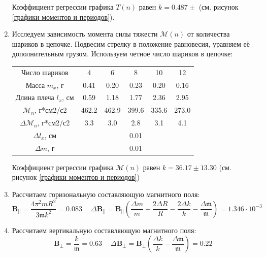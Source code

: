 \documentclass[a4paper, 10pt]{article}
\begin{document}
\begin{enumerate}
\begin{center}
\begin{tabular}{|c|c|c|c|c|c|c|c|c|c|c|}
            \hline
        \end{tabular}
    \end{center}
    Коэффициент регрессии графика $T(n)$ равен $k = 0.487\pm$ (см. рисунок \ref{графики моментов и периодов}).
    \item Исследуем зависимость момента силы тяжести $\mathcal{M}(n)$ от количества шариков в цепочке. Подвесим стрелку в положение равновесия, уравняем её дополнительным грузом. Используем четное число шариков в цепочке:
    \begin{center}
        \begin{tabular}{|c|c|c|c|c|c|}
            \hline
            Число шариков & 4 & 6 & 8 & 10 & 12\\
            Масса $m_{x}$, г & 0.41 & 0.20 & 0.23 & 0.20 & 0.16\\
            Длина плеча $l_{x}$, см & 0.59 & 1.18 & 1.77 & 2.36 & 2.95\\
            $\mathcal{M}_{n}$, г*см2/с2 & 462.2 & 462.9 & 399.6 & 335.6 & 273.0\\
            $\Delta \mathcal{M}_{n}$, г*см2/с2 & 3.3 & 3.0 & 2.8 & 3.1 & 4.1\\
            \hline
            $\Delta l_{x}$, см & \multicolumn{5}{|c|}{0.01}\\
            $\Delta m$, г & \multicolumn{5}{|c|}{0.01}\\
            \hline
        \end{tabular}
        \label{дополнительный груз для магнитной стрелки}
    \end{center}
    Коэффициент регрессии графика $\mathcal{M}(n)$ равен $k = 36.17\pm 13.30$ (см. рисунок \ref{графики моментов и периодов})
    \item Рассчитаем горизональную составляющую магнитного поля:
    \begin{equation*}
        \mathbf{B_{||}} = \frac{4\pi^{2} mR^{2}}{3\mathfrak{m}k^{2}} = 0.083\ \text{} \quad
        \Delta \mathbf{B_{||}} = \mathbf{B_{||}}\left(\frac{\Delta m}{m} + \frac{2\Delta R}{R} - \frac{2\Delta k}{k} - \frac{\Delta \mathfrak{m}}{\mathfrak{m}}\right) = 1.346 \cdot10^{-3}\ \text{}
    \end{equation*}
    \item Рассчитаем вертикальную составляющую магнитного поля:
    \begin{equation*}
        \mathbf{B_{\perp}} = \frac{k}{\mathfrak{m}} = 0.63\ \text{} \quad
        \Delta \mathbf{B_{\perp}} = \mathbf{B_{\perp}}\left(\frac{\Delta k}{k} - \frac{\Delta \mathfrak{m}}{\mathfrak{m}}\right) = 0.22\ \text{}

\end{equation*}
\end{enumerate}
\end{document}
